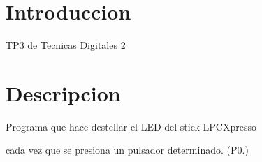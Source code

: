 \hypertarget{index_intro_sec}{}\section{Introduccion}\label{index_intro_sec}
T\-P3 de Tecnicas Digitales 2\hypertarget{index_Descripcion}{}\section{Descripcion}\label{index_Descripcion}
Programa que hace destellar el L\-E\-D del stick L\-P\-C\-Xpresso\par
cada vez que se presiona un pulsador determinado. (P0.) 